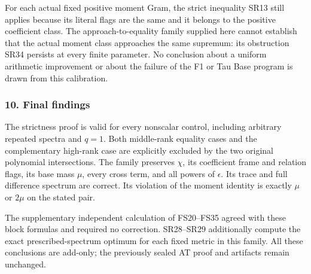 \documentclass{article}
\begin{document}
For each actual fixed positive moment Gram, the strict inequality SR13 still applies because its literal flags are the same and it belongs to the positive coefficient class. The approach-to-equality family supplied here cannot establish that the actual moment class approaches the same supremum: its obstruction SR34 persists at every finite parameter. No conclusion about a uniform arithmetic improvement or about the failure of the F1 or Tau Base program is drawn from this calibration.

\subsubsection{10. Final findings}\label{endpoint-four_window_sharpness_review--final-findings}

The strictness proof is valid for every nonscalar control, including arbitrary repeated spectra and \(q=1\). Both middle-rank equality cases and the complementary high-rank case are explicitly excluded by the two original polynomial intersections. The family preserves \(\chi\), its coefficient frame and relation flags, its base mass \(\mu\), every cross term, and all powers of \(\epsilon\). Its trace and full difference spectrum are correct. Its violation of the moment identity is exactly \(\mu\) or \(2\mu\) on the stated pair.

The supplementary independent calculation of FS20--FS35 agreed with these block formulas and required no correction. SR28--SR29 additionally compute the exact prescribed-spectrum optimum for each fixed metric in this family. All these conclusions are add-only; the previously sealed AT proof and artifacts remain unchanged.

\endgroup
\end{document}
